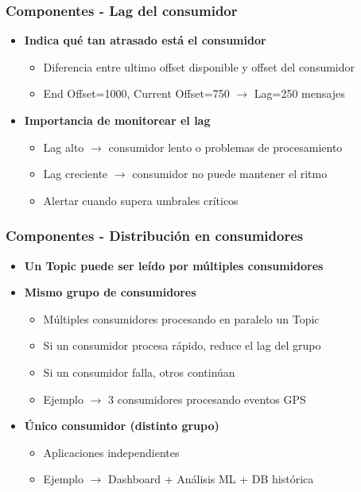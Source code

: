 \documentclass[aspectratio=169]{beamer}
\begin{document}
\begin{frame}\frametitle{Componentes - Lag del consumidor}
\begin{itemize}
  \item \textbf{Indica qué tan atrasado está el consumidor}
  \begin{itemize}
    \item Diferencia entre ultimo offset disponible y offset del consumidor
    \item End Offset=1000, Current Offset=750 $\rightarrow$ Lag=250 mensajes
  \end{itemize}

  \vspace{1em}
  \vspace{1em}

  \item \textbf{Importancia de monitorear el lag}
  \begin{itemize}
    \item Lag alto $\rightarrow$ consumidor lento o problemas de procesamiento
    \item Lag creciente $\rightarrow$ consumidor no puede mantener el ritmo
    \item Alertar cuando supera umbrales críticos
  \end{itemize}
\end{itemize}
\end{frame}

\begin{frame}\frametitle{Componentes - Distribución en consumidores}
\begin{itemize}
  \item \textbf{Un Topic puede ser leído por múltiples consumidores}

  \vspace{1em}

  \item \textbf{Mismo grupo de consumidores}
  \begin{itemize}
    \item Múltiples consumidores procesando en paralelo un Topic
    \item Si un consumidor procesa rápido, reduce el lag del grupo
    \item Si un consumidor falla, otros continúan
    \item Ejemplo $\rightarrow$ 3 consumidores procesando eventos GPS
  \end{itemize}

  \vspace{1em}

  \item \textbf{Único consumidor (distinto grupo)}
  \begin{itemize}
    \item Aplicaciones independientes
    \item Ejemplo $\rightarrow$ Dashboard + Análisis ML + DB histórica
  \end{itemize}
\end{itemize}
\end{frame}
\end{document}

